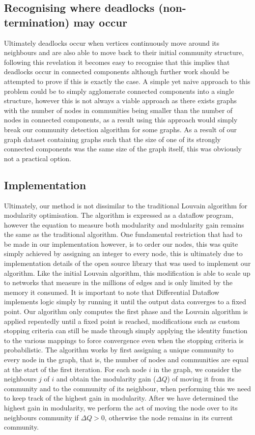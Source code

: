 \subsection{Recognising where deadlocks (non-termination) may occur}
Ultimately deadlocks occur when vertices continuously move around its neighbours and are also able to move back to their initial community structure, following this revelation it becomes easy to recognise that this implies that deadlocks occur in connected components although further work should be attempted to prove if this is exactly the case. A simple yet naive approach to this problem could be to simply agglomerate connected components into a single structure, however this is not always a viable approach as there exists graphs with the number of nodes in communities being smaller than the number of nodes in connected components, as a result using this approach would simply break our community detection algorithm for some graphs. As a result of our graph dataset containing graphs such that the size of one of its strongly connected components was the same size of the graph itself, this was obviously not a practical option. 


\subsection{Implementation}
Ultimately, our method is not dissimilar to the traditional Louvain \cite{blondel2008fast} algorithm for modularity optimisation. The algorithm is expressed as a dataflow program, however the equation to measure both modularity and modularity gain remains the same as the traditional algorithm. One fundamental restriction that had to be made in our implementation however, is to order our nodes, this was quite simply achieved by assigning an integer to every node, this is ultimately due to implementation details of the open source library that was used to implement our algorithm. Like the initial Louvain algorithm, this modification is able to scale up to networks that measure in the millions of edges and is only limited by the memory it consumed. It is important to note that Differential Dataflow implements logic simply by running it until the output data converges to a fixed point. Our algorithm only computes the first phase and the Louvain algorithm is applied repeatedly until a fixed point is reached, modifications such as custom stopping criteria can still be made through simply applying the identity function to the various mappings to force convergence even when the stopping criteria is probabilistic. The algorithm works by first assigning a unique community to every node in the graph, that is, the number of nodes and communities are equal at the start of the first iteration. For each node $i$ in the graph, we consider the neighbours $j$ of $i$ and obtain the modularity gain ($\Delta Q$) of moving it from its community and to the community of its neighbour, when performing this we need to keep track of the highest gain in modularity. After we have determined the highest gain in modularity, we perform the act of moving the node over to its neighbours community if $\Delta Q > 0$, otherwise the node remains in its current community. 
